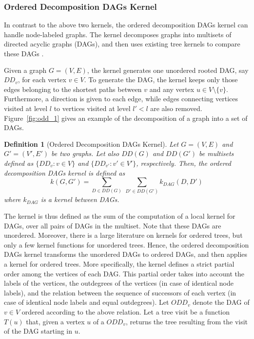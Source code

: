 \documentclass[twoside,11pt]{article}
\newtheorem{definition}{Definition}
\begin{document}
\subsubsection{Ordered Decomposition DAGs Kernel}
In contrast to the above two kernels, the ordered decomposition DAGs kernel can handle node-labeled graphs.
The kernel decomposes graphs into multisets of directed acyclic graphs (DAGs), and then uses existing tree kernels to compare these DAGs .

Given a graph $G=(V,E)$, the kernel generates one unordered rooted DAG, say $DD_v$, for each vertex $v \in V$.
To generate the DAG, the kernel keeps only those edges belonging to the shortest paths between $v$ and any vertex $u \in V \setminus \{v\}$.
Furthermore, a direction is given to each edge, while edges connecting vertices visited at level $l$ to vertices visited at level $l' < l$ are also removed.
Figure~\ref{fig:odd_1} gives an example of the decomposition of a graph into a set of DAGs.
\begin{definition}[Ordered Decomposition DAGs Kernel]
  Let $G=(V,E)$ and $G'=(V',E')$ be two graphs.
  Let also $DD(G)$ and $DD(G')$ be multisets defined as $\{ DD_v : v \in V\}$ and $\{ DD_{v'} : {v'} \in V'\}$, respectively.
  Then, the ordered decomposition DAGs kernel is defined as
  \begin{equation}
    k(G, G') = \sum_{D \in DD(G)} \ \sum_{D' \in DD(G')} k_{DAG}(D, D')
  \end{equation}
  where $k_{DAG}$ is a kernel between DAGs.
\end{definition}
The kernel is thus defined as the sum of the computation of a local kernel for DAGs, over all pairs of DAGs in the multiset. 
Note that these DAGs are unordered.
Moreover, there is a large literature on kernels for ordered trees, but only a few kernel functions for unordered trees.
Hence, the ordered decomposition DAGs kernel transforms the unordered DAGs to ordered DAGs, and then applies a kernel for ordered trees.
More specifically, the kernel defines a strict partial order among the vertices of each DAG.
This partial order takes into account the labels of the vertices, the outdegrees of the vertices (in case of identical node labels), and the relation between the sequence of successors of each vertex (in case of identical node labels and equal outdegrees).
Let $ODD_v$ denote the DAG of $v \in V$ ordered according to the above relation.
Let a tree visit be a function $T(u)$ that, given a vertex $u$ of a $ODD_v$, returns the tree resulting from the visit of the DAG starting in $u$.
\end{document}
